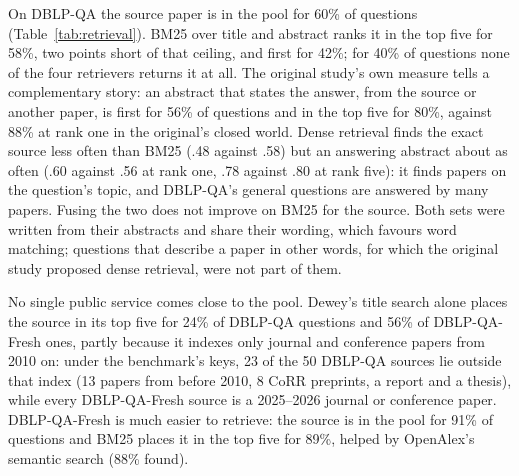\documentclass[conference]{IEEEtran}
\newcommand{\dq}{DBLP-QA}
\newcommand{\fresh}{DBLP-QA-Fresh}
\begin{document}
On \dq{} the source paper is in the pool for 60\% of questions (Table~\ref{tab:retrieval}). BM25 over
title and abstract ranks it in the top five for 58\%, two points short of that ceiling, and first for
42\%; for 40\% of questions none of the four retrievers returns it at all. The original study's own
measure tells a complementary story: an abstract that states the answer, from the source or another
paper, is first for 56\% of questions and in the top five for 80\%, against 88\% at rank one in the
original's closed world. Dense retrieval finds the exact source less often than BM25 (.48 against .58)
but an answering abstract about as often (.60 against .56 at rank one, .78 against .80 at rank five): it finds papers on the question's topic,
and \dq{}'s general questions are answered by many papers. Fusing the two does not improve on BM25 for
the source. Both sets were written from their abstracts and share their wording, which favours word
matching; questions that describe a paper in other words, for which the original study proposed dense
retrieval, were not part of them.

No single public service comes close to the pool. Dewey's title search alone places the source in its top
five for 24\% of \dq{} questions and 56\% of \fresh{} ones, partly because it indexes only journal and
conference papers from 2010 on: under the benchmark's keys, 23 of the 50 \dq{} sources lie outside that
index (13 papers from before 2010, 8 CoRR preprints, a report and a thesis), while every \fresh{} source
is a 2025--2026 journal or conference paper. \fresh{} is much easier to retrieve: the source is in the pool
for 91\% of questions and BM25 places it in the top five for 89\%, helped by OpenAlex's semantic search
(88\% found).
\end{document}
